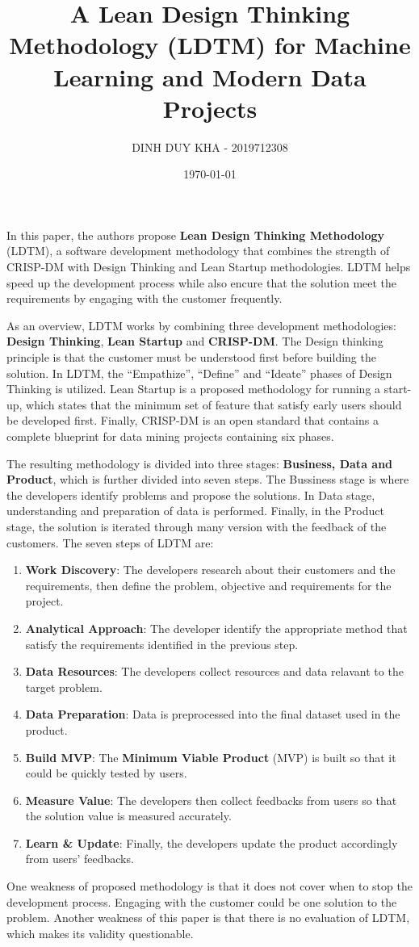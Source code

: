 \documentclass[11pt]{article}
\author{DINH DUY KHA - 2019712308}
\date{\today}
\title{A Lean Design Thinking Methodology (LDTM) for Machine Learning and  Modern Data Projects}
\begin{document}
\maketitle
\tableofcontents

In this paper, the authors propose \textbf{Lean Design Thinking Methodology} (LDTM), a software development methodology that combines the strength of CRISP-DM with Design Thinking and Lean Startup methodologies. LDTM helps speed up the development process while also encure that the solution meet the requirements by engaging with the customer frequently.

As an overview, LDTM works by combining three development methodologies: \textbf{Design Thinking}, \textbf{Lean Startup} and \textbf{CRISP-DM}.  The Design thinking principle is that the customer must be understood first before building the solution. In LDTM,  the ``Empathize'', ``Define'' and ``Ideate'' phases of Design Thinking is utilized. Lean Startup is a proposed methodology for running a start-up, which states that the minimum set of feature that satisfy early users should be developed first. Finally, CRISP-DM is an open standard that contains a complete blueprint for data mining projects containing six phases.

The resulting methodology is divided into three stages: \textbf{Business, Data and Product}, which is further divided into seven steps. The Bussiness stage is where the developers identify problems and propose the solutions. In Data stage, understanding and preparation of data is performed. Finally, in the Product stage, the solution is iterated through many version with the feedback of the customers.
The seven steps of LDTM are:
\begin{enumerate}
\item \textbf{Work Discovery}: The developers research about their customers and the requirements, then define the problem, objective and requirements for the project.
\item \textbf{Analytical Approach}: The developer identify the appropriate method that satisfy the requirements identified in the previous step.
\item \textbf{Data Resources}: The developers collect resources and data relavant to the target problem.
\item \textbf{Data Preparation}: Data is preprocessed into the final dataset used in the product.
\item \textbf{Build MVP}: The \textbf{Minimum Viable Product} (MVP) is built so that it could be quickly tested by users.
\item \textbf{Measure Value}: The developers then collect feedbacks from users so that the solution value is measured accurately.
\item \textbf{Learn \& Update}: Finally, the developers update the product accordingly from users' feedbacks.
\end{enumerate}



One weakness of proposed methodology is that it does not cover when to stop the development process. Engaging with the customer could be one solution to the problem. Another weakness of this paper is that there is no evaluation of LDTM, which makes its validity questionable.
\end{document}
